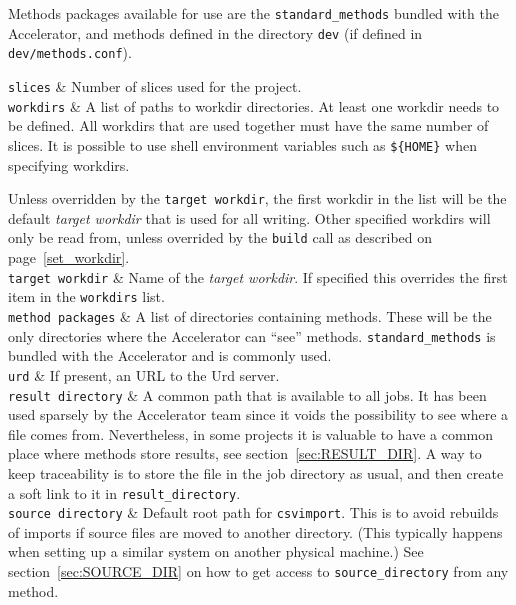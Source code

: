 Methods packages available for use are the \texttt{standard\_methods} bundled
with the Accelerator, and methods defined in the
directory \texttt{dev} (if defined in \texttt{dev/methods.conf}).

\starttabletwo

\RPtwo \texttt{slices} & Number of slices used for the project.\\[1ex]

\RPtwo \texttt{workdirs} & A list of paths to workdir directories.  At
least one workdir needs to be defined.  All workdirs that are used
together must have the same number of slices.  It is possible to use
shell environment variables such as \texttt{\$\{HOME\}} when
specifying workdirs.

Unless overridden by the \texttt{target workdir}, the first workdir in
the list will be the default \textsl{target workdir} that is used for
all writing.  Other specified workdirs will only be read from, unless
overrided by the \texttt{build} call as described on
page~\ref{set_workdir}.\\[1ex]

\RPtwo \texttt{target workdir} & Name of the \textsl{target workdir}.
If specified this overrides the first item in the \texttt{workdirs}
list.\\[1ex]

\RPtwo \texttt{method packages} & A list of directories containing
methods.  These will be the only directories where the Accelerator can
``see'' methods.  \texttt{standard\_methods} is bundled with the
Accelerator and is commonly used.\\[1ex]

\RPtwo \texttt{urd} & If present, an URL to the Urd server.\\[1ex]

\RPtwo \texttt{result directory} & A common path that is available to
all jobs.  It has been used sparsely by the Accelerator team since it
voids the possibility to see where a file comes from.  Nevertheless,
in some projects it is valuable to have a common place where methods
store results, see section~\ref{sec:RESULT_DIR}.  A way to keep
traceability is to store the file in the job directory as usual, and
then create a soft link to it in \texttt{result\_directory}.\\[1ex]

\RPtwo \texttt{source directory} & Default root path for
\texttt{csvimport}.  This is to avoid rebuilds of imports if source
files are moved to another directory.  (This typically happens when
setting up a similar system on another physical machine.)  See
section~\ref{sec:SOURCE_DIR} on how to get access to
\texttt{source\_directory} from any method.\\[1ex]

